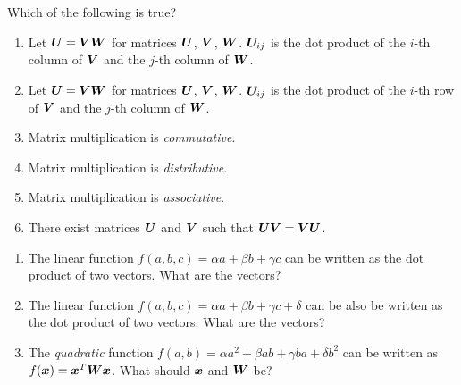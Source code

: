 \documentclass[11pt]{article}
\begin{document}
\begin{Exercise}
\noindent Which of the following is true?
	
\begin{enumerate}
\item Let ${\bm U} = {\bm V}{\bm W}$ for matrices ${\bm U}$, ${\bm V}$, ${\bm W}$. ${\bm U}_{ij}$ is the dot product of the $i$-th column of ${\bm V}$ and the $j$-th column of ${\bm W}$. 
\item Let ${\bm U} = {\bm V}{\bm W}$ for matrices ${\bm U}$, ${\bm V}$, ${\bm W}$. ${\bm U}_{ij}$ is the dot product of the $i$-th row of ${\bm V}$ and the $j$-th column of ${\bm W}$. 
\item Matrix multiplication is \emph{commutative}. 
\item Matrix multiplication is \emph{distributive}. 

\item Matrix multiplication is \emph{associative}. 
\item There exist matrices ${\bm U}$ and ${\bm V}$ such that ${\bm U}{\bm V} = {\bm V}{\bm U}$. 

\end{enumerate}
\end{Exercise}


\begin{Exercise}
\begin{enumerate}
	\item The linear function $f(a, b, c) = \alpha a + \beta b + \gamma c$ can be written as the dot product of two vectors. What are the vectors? 
	\item The linear function $f(a, b, c) = \alpha a + \beta b + \gamma c + \delta$ can be also be written as the dot product of two vectors. What are the vectors? 
	\item The \emph{quadratic} function $f(a, b) = \alpha a^2 + \beta ab + \gamma ba + \delta b^2$ can be written as $f({\bm x}) = {\bm x}^T{\bm W}{\bm x}$. What should ${\bm x}$ and ${\bm W}$ be? 
\end{enumerate}
\end{Exercise}
\end{document}
